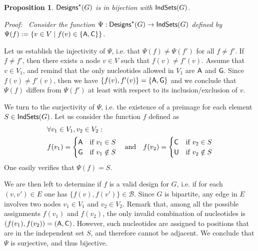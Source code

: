 \documentclass{bioinfo}
\newtheorem{proposition}[theorem]{Proposition}
\renewenvironment{proof}[1][]{\noindent \em Proof\ifthenelse{\equal{#1}{}}{}{ (#1)}:~}{}
\newcommand{\B}{\mathcal{B}}
\newcommand{\Design}[1]{{\sf Designs}^{\star}(#1)}
\newcommand{\IS}[1]{{\sf IndSets}(#1)}
\newcommand{\Nuc}[1]{{\sf #1}}
\newcommand{\Ab}{\Nuc{A}}
\newcommand{\Cb}{\Nuc{C}}
\newcommand{\Gb}{\Nuc{G}}
\newcommand{\Ub}{\Nuc{U}}
\begin{document}
\begin{proposition}
 $\Design{G}$ is in bijection with $\IS{G}$.
\end{proposition}
\begin{proof}
Consider the function $\Psi: \Design{G} \to \IS{G}$ defined by $ \Psi(f) := \left\{v\in V\mid f(v)\in\{\Ab,\Cb\}\right\}.$

Let us establish the injectivity of  $\Psi$, i.e. that $\Psi(f)\neq\Psi(f')$ for all $f\neq f'$.
If $f\neq f'$, then there exists a node $v\in V$ such that $f(v)\neq f'(v)$. 
Assume that $v\in V_1$, and remind that the only nucleotides allowed in $V_1$ are $\Ab$ and $\Gb$. Since $f(v)\neq f'(v)$, then we have $\{f(v),f'(v)\}=\{\Ab,\Gb\}$
and we conclude that $\Psi(f)$ differs from $\Psi(f')$ at least with respect to its inclusion/exclusion of $v$.

We turn to the surjectivity of $\Psi$, i.e. the existence of a preimage for each element $S\in \IS{G}$. Let us consider the function $f$ defined as
\begin{align}
 &\forall v_1\in V_1,v_2\in V_2:\notag\\& f(v_1) = \begin{cases} \Ab & \text{if }v_1\in S\\ \Gb & \text{if }v_1\notin S\end{cases} \text{\quad and\quad} 
 f(v_2) = \begin{cases} \Cb & \text{if }v_2\in S\\ \Ub & \text{if }v_2\notin S\end{cases}
\end{align}
One easily verifies that $\Psi(f) = S$. 

We are then left to determine if $f$ is a valid design for $G$, i.e. if for each $(v, v') \in E$ one has  $\{f(v),f(v')\}\in \B.$ Since $G$ is bipartite, any edge in $E$ involves two nodes $v_1\in V_1$ and $v_2\in V_2$. Remark that, among all the possible assignments $f(v_1)$ and $f(v_2)$, the only invalid combination of nucleotides is $(f(v_1),f(v_2)) = (\Ab,\Cb)$. However, such nucleotides are assigned to positions that are in the independent set $S$, and therefore cannot be adjacent. We conclude that $\Psi$ is surjective, and thus bijective.
\end{proof}
\end{document}
